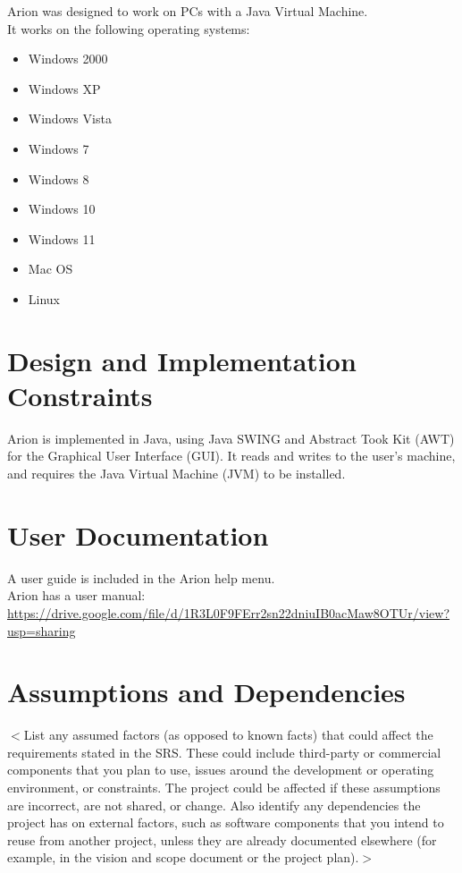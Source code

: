 \documentclass{scrreprt}
\begin{document}
\begin{flushleft} %
    Arion was designed to work on PCs with a Java Virtual Machine. \\

    It works on the following operating systems: \\
    \begin{itemize}
        \item Windows 2000
        \item Windows XP
        \item Windows Vista
        \item Windows 7
        \item Windows 8
        \item Windows 10
        \item Windows 11
        \item Mac OS
        \item Linux
    \end{itemize}
\end{flushleft}

\section{Design and Implementation Constraints}
Arion is implemented in Java, using Java SWING and Abstract Took Kit (AWT) for the Graphical User Interface (GUI).
It reads and writes to the user’s machine, and requires the Java Virtual Machine (JVM) to be installed.

\section{User Documentation}
\begin{flushleft}
    A user guide is included in the Arion help menu. \\
    Arion has a user manual: \\
    \url{https://drive.google.com/file/d/1R3L0F9FErr2sn22dniuIB0acMaw8OTUr/view?usp=sharing}
\end{flushleft}

\section{Assumptions and Dependencies}

$<$List any assumed factors (as opposed to known facts) that could affect the 
requirements stated in the SRS. These could include third-party or commercial 
components that you plan to use, issues around the development or operating 
environment, or constraints. The project could be affected if these assumptions 
are incorrect, are not shared, or change. Also identify any dependencies the 
project has on external factors, such as software components that you intend to 
reuse from another project, unless they are already documented elsewhere (for 
example, in the vision and scope document or the project plan).$>$
\end{document}
